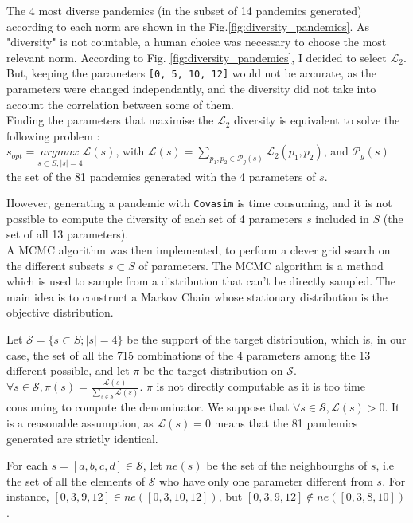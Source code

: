 The 4 most diverse pandemics (in the subset of 14 pandemics generated) according to each norm are shown in the Fig.\ref{fig:diversity_pandemics}.
As "diversity" is not countable, a human choice was necessary to choose the most relevant norm.
According to Fig. \ref{fig:diversity_pandemics}, I decided to select $\mathcal{L}_2$.
But, keeping the parameters \texttt{[0, 5, 10, 12]} would not be accurate, as the parameters were changed independantly, and the diversity did not take into account the correlation between some of them. \\

Finding the parameters that maximise the $\mathcal{L}_2$ diversity is equivalent to solve the following problem : \\

$ s_{opt} = \underset{s \subset S , \vert s \vert =4 }{argmax  } \mathcal{ L}(s)$, with $ \mathcal{L}(s)= \sum_{p_1, p_2 \in \mathcal{P}_g(s)  }{\mathcal{L}_2(p_1,p_2)}$, and  $\mathcal{P}_{g}(s)$ the set of the 81 pandemics generated with the 4 parameters of $s$.

However, generating a pandemic with \texttt{Covasim} is time consuming, and it is not possible to compute the diversity of each set of 4 parameters $s$ included in $S$ (the set of all 13 parameters).\\[1cm]


A MCMC algorithm \cite*{diaconis2009markov} was then implemented, to perform a clever grid search on the different subsets $s \subset S $ of parameters.
The MCMC algorithm is a method which is used to sample from a distribution that can't be directly sampled. 
The main idea is to construct a Markov Chain whose stationary distribution is the objective distribution.

Let $\mathcal{S} = \{ s\subset S ;  \vert s \vert = 4 \}$ be the support of the target distribution, which is, in our case, the set of all the 715 combinations of the 4 parameters among the 13 different possible, and let $\pi$ be the target distribution on $\mathcal{S}$.
$\forall s \in \mathcal{S}, \pi(s) = \frac{\mathcal{L}(s)}{\sum_{s \in \mathcal{S}}  \mathcal{L}(s)} $. $\pi$ is not directly computable as it is too time consuming to compute the denominator.
We suppose that $\forall s \in \mathcal{S}, \mathcal{L}(s) >0$.
It is a reasonable assumption, as $\mathcal{L}(s) = 0 $ means that the 81 pandemics generated   are strictly identical. 

For each $s = [a, b, c, d] \in \mathcal{S}$, let $ne(s)$ be the set of the neighbourghs of $s$, i.e the set of all the elements of $\mathcal{S}$ who have only one parameter different from $s$. 
For instance, $[0, 3, 9, 12] \in ne([0, 3, 10, 12])$, but $[0, 3, 9, 12] \notin ne([0, 3, 8, 10])$.\\

